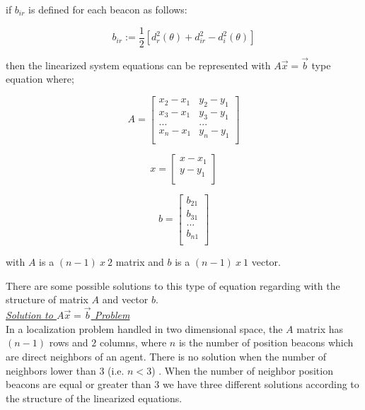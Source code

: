 if $b_{ir}$ is defined for each beacon as follows:

\begin{equation}
b_{ir} := \frac{1}{2}[d_r^2(\theta) + d_{ir}^2 - d_i^2(\theta)]
\end{equation}

then the linearized system equations can be represented with $A\vec{x} = \vec{b}$ type equation where;

\begin{equation}
A = \begin{bmatrix}
x_2 - x_1 & y_2 - y_1\\
x_3 - x_1 & y_3 - y_1\\
...       & ...      \\
x_n - x_1 & y_n - y_1\\
\end{bmatrix}				
\end{equation}

\begin{equation}
x = \begin{bmatrix}
x - x_1\\
y - y_1\\
\end{bmatrix}
\end{equation}

\begin{equation}
b = \begin{bmatrix}
b_{21}\\
b_{31}\\
... \\
b_{n1}\\
\end{bmatrix}
\end{equation}

with $A$ is a $(n-1)\ x\ 2$ matrix and $b$ is a $(n-1)\ x\ 1$ vector.

There are some possible solutions to this type of equation regarding with the structure of matrix $A$ and vector $b$.\\

\underline {\textit{Solution to $A\vec{x} = \vec{b}$ Problem}}\\
In a localization problem handled in two dimensional space, the $A$ matrix has $(n-1)$ rows and $2$ columns, where $n$ is the number of position beacons which are direct neighbors of an agent. There is no solution when the number of neighbors lower than $3$ (i.e. $n<3$) \cite{22}. When the number of neighbor position beacons are equal or greater than $3$ we have three different solutions according to the structure of the linearized equations.

